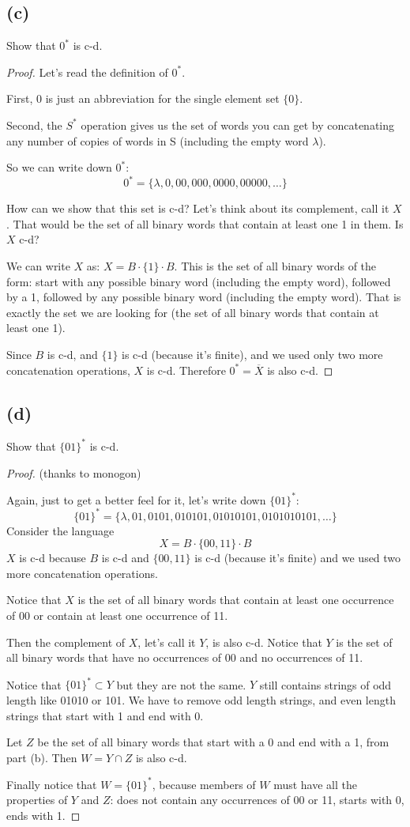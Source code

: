 \documentclass[14pt]{extarticle}
\begin{document}
\subsection{(c)}
Show that $0^*$ is c-d.
\begin{proof}
Let's read the definition of $0^*$. 

First, $0$ is just an abbreviation for the single element set $\{0\}$. 

Second, the $S^*$ operation gives us the set of words you can get by concatenating any number of copies of words in S (including the empty word $\lambda$).

So we can write down $0^*$:
$$
0^* = \{\lambda, 0, 00, 000, 0000, 00000, \ldots\}
$$

How can we show that this set is c-d? Let's think about its complement, call it $X$. That would be the set of all binary words that contain at least one 1 in them. Is $X$ c-d?

We can write $X$ as: $X = B \cdot \{1\} \cdot B$. This is the set of all binary words of the form: start with any possible binary word (including the empty word), followed by a 1, followed by any possible binary word (including the empty word). That is exactly the set we are looking for (the set of all binary words that contain at least one 1).

Since $B$ is c-d, and $\{1\}$ is c-d (because it's finite), and we used only two more concatenation operations, $X$ is c-d. Therefore $0^* = \overline{X}$ is also c-d.
\end{proof}

\subsection{(d)}
Show that $\{01\}^*$ is c-d.
\begin{proof}
(thanks to monogon)

Again, just to get a better feel for it, let's write down $\{01\}^*$:
$$
\{01\}^* = \{\lambda, 01, 0101, 010101, 01010101, 0101010101, \ldots\}
$$
Consider the language
$$
X = B\cdot\{00, 11\}\cdot B
$$
$X$ is c-d because $B$ is c-d and $\{00, 11\}$ is c-d (because it's finite) and we used two more concatenation operations.

Notice that $X$ is the set of all binary words that contain at least one occurrence of 00 or contain at least one occurrence of 11.

Then the complement of $X$, let's call it $Y$, is also c-d. Notice that $Y$ is the set of all binary words that have no occurrences of 00 and no occurrences of 11. 

Notice that $\{01\}^* \subset Y$ but they are not the same. $Y$ still contains strings of odd length like 01010 or 101. We have to remove odd length strings, and even length strings that start with 1 and end with 0.

Let $Z$ be the set of all binary words that start with a 0 and end with a 1, from part (b). Then $W = Y \cap Z$ is also c-d.

Finally notice that $W = \{01\}^*$, because members of $W$ must have all the properties of $Y$ and $Z$: does not contain any occurrences of 00 or 11, starts with 0, ends with 1.
\end{proof}
\end{document}
